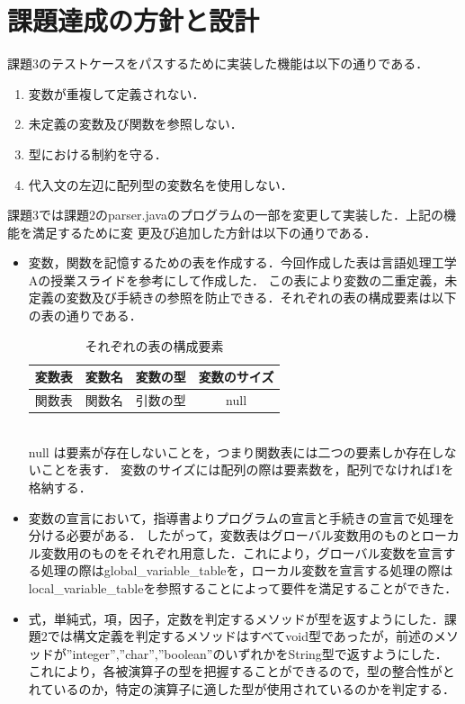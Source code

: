 \documentclass[dvipdfmx]{jarticle}
\begin{document}
\section{課題達成の方針と設計}
課題3のテストケースをパスするために実装した機能は以下の通りである．
\begin{enumerate}
  \item 変数が重複して定義されない．
  \item 未定義の変数及び関数を参照しない．
  \item 型における制約を守る．
  \item 代入文の左辺に配列型の変数名を使用しない．
\end{enumerate}
課題3では課題2のparser.javaのプログラムの一部を変更して実装した．上記の機能を満足するために変
更及び追加した方針は以下の通りである．
\begin{itemize}
  \item 変数，関数を記憶するための表を作成する．今回作成した表は言語処理工学Aの授業スライドを参考にして作成した．
  この表により変数の二重定義，未定義の変数及び手続きの参照を防止できる．それぞれの表の構成要素は以下の表の通りである．
  \begin{table}[h]
    \centering
    \begin{tabular}{|c||c|c|c|}
      \hline
      変数表 & 変数名 & 変数の型 & 変数のサイズ\\\hline
      関数表 & 関数名 & 引数の型 & null\\\hline
    \end{tabular}
    \caption{それぞれの表の構成要素}
  \end{table}
  \\null は要素が存在しないことを，つまり関数表には二つの要素しか存在しないことを表す．
  変数のサイズには配列の際は要素数を，配列でなければ1を格納する．
  \item 変数の宣言において，指導書よりプログラムの宣言と手続きの宣言で処理を分ける必要がある．
  したがって，変数表はグローバル変数用のものとローカル変数用のものをそれぞれ用意した．これにより，グローバル変数を宣言する処理の際はglobal\_variable\_tableを，ローカル変数を宣言する処理の際はlocal\_variable\_tableを参照することによって要件を満足することができた．
  \item 式，単純式，項，因子，定数を判定するメソッドが型を返すようにした．課題2では構文定義を判定するメソッドはすべてvoid型であったが，前述のメソッドが”integer”,”char”,”boolean”のいずれかをString型で返すようにした．
  これにより，各被演算子の型を把握することができるので，型の整合性がとれているのか，特定の演算子に適した型が使用されているのかを判定する．
\end{itemize}
\end{document}
